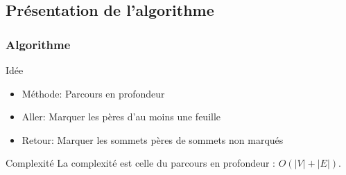   \subsection{Présentation de l'algorithme}
  \begin{frame}
   \frametitle{Algorithme}
   \begin{block}{Idée}
    \begin{itemize}
     \item Méthode: Parcours en profondeur
     \item Aller: Marquer les pères d'au moins une feuille
     \item Retour: Marquer les sommets pères de sommets non marqués
    \end{itemize}
   \end{block}

   \begin{block}{Complexité}
    La complexité est celle du parcours en profondeur : $O(|V| + |E|)$.
   \end{block}
  \end{frame}

